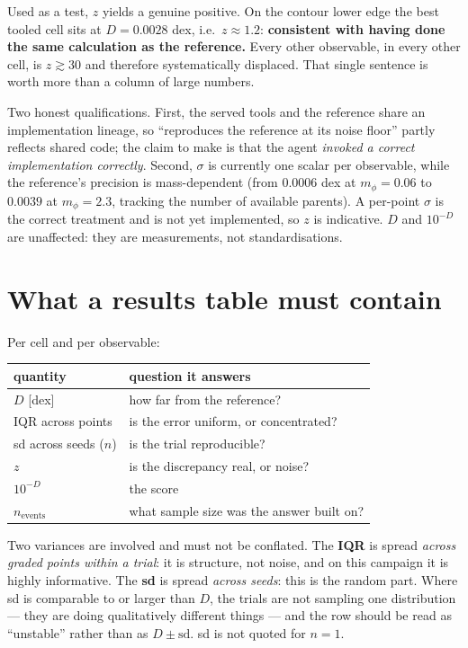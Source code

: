 \documentclass[11pt]{article}
\newcommand{\mphi}{m_\phi}
\begin{document}
Used as a test, $z$ yields a genuine positive. On the contour lower edge the
best tooled cell sits at $D=0.0028$ dex, i.e.\ $z\approx1.2$: \textbf{consistent
with having done the same calculation as the reference.} Every other
observable, in every other cell, is $z\gtrsim30$ and therefore systematically
displaced. That single sentence is worth more than a column of large numbers.

Two honest qualifications. First, the served tools and the reference share an
implementation lineage, so ``reproduces the reference at its noise floor''
partly reflects shared code; the claim to make is that the agent \emph{invoked a
correct implementation correctly}. Second, $\sigma$ is currently one scalar per
observable, while the reference's precision is mass-dependent (from $0.0006$ dex
at $\mphi=0.06$ to $0.0039$ at $\mphi=2.3$, tracking the number of available
parents). A per-point $\sigma$ is the correct treatment and is not yet
implemented, so $z$ is indicative. $D$ and $10^{-D}$ are unaffected: they are
measurements, not standardisations.

\section{What a results table must contain}\label{sec:report}

Per cell and per observable:

\begin{center}
\begin{tabular}{ll}
\toprule
quantity & question it answers \\ \midrule
$D$ [dex]        & how far from the reference? \\
IQR across points & is the error uniform, or concentrated? \\
sd across seeds ($n$) & is the trial reproducible? \\
$z$              & is the discrepancy real, or noise? \\
$10^{-D}$        & the score \\
$n_{\mathrm{events}}$ & what sample size was the answer built on? \\
\bottomrule
\end{tabular}
\end{center}

Two variances are involved and must not be conflated. The \textbf{IQR} is spread
\emph{across graded points within a trial}: it is structure, not noise, and on
this campaign it is highly informative. The \textbf{sd} is spread \emph{across
seeds}: this is the random part. Where sd is comparable to or larger than $D$,
the trials are not sampling one distribution --- they are doing qualitatively
different things --- and the row should be read as ``unstable'' rather than as
$D\pm\mathrm{sd}$. sd is not quoted for $n=1$.
\end{document}
